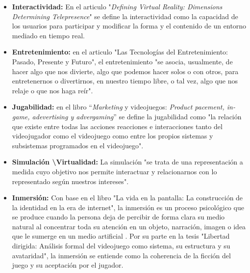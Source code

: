 	\begin{itemize}
		\item \textbf{Interactividad:} En el articulo "\textit{Defining Virtual Reality:
		 Dimensions Determining Telepresence}" se define la interactividad como la 
		 capacidad de los usuarios para participar y modificar la forma y el contenido 
		 de un entorno mediado en tiempo real\cite{RefInteractividad}.  
		
		\item \textbf{Entretenimiento:} en el articulo "Las Tecnologías del
		 Entretenimiento: Pasado, Presente y Futuro", el entretenimiento "se asocia, 
		 usualmente, de hacer algo que nos divierte, algo que podemos hacer solos o con 
		 otros, para entretenernos o divertirnos, en nuestro tiempo libre, o tal vez, 
		 algo que nos relaje o que nos haga reír"\cite{RefEntretenimiento}. 
		
		\item \textbf{Jugabilidad:} en el libro “\textit{Marketing} y videojuegos: 
	\textit{Product pacement, in-game, adevertising y advergaming}” se define la 
	jugabilidad como "la relación que existe entre todas las acciones reacciones e 
	interacciones tanto del videojugador como el videojuego como entre los propios 
	sistemas y subsistemas programados en el videojuego"\cite{RefCarac}.		
	
		\item \textbf{Simulación \textbackslash Virtualidad:} La simulación "se trata 
		de una representación a medida cuyo objetivo nos permite interactuar y 
		relacionarnos con lo representado según nuestros intereses"\cite{RefCarac}.
		
		\item \textbf{Inmersión:} Con base en el libro "La vida en la pantalla: La
		 construcción de la identidad en la era de internet", la inmersión es un 
		 proceso psicológico que se produce cuando la persona deja de percibir de 
		 forma clara su medio natural al concentrar toda su atención en un objeto,
		  narración, imagen o idea que le sumerge en un medio artificial 
		  \cite{RefInmersion}. Por su parte en la tesis "Libertad dirigida: Análisis 
		  formal del videojuego como sistema, su estructura y su avataridad", la 
		  inmersión se entiende como la coherencia de la ficción del juego y su 
		  aceptación por el jugador.\cite{refInmersionNavarro}  
	\end{itemize} 

